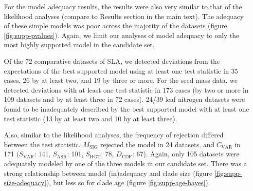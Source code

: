 \documentclass[a4paper,11pt]{article}
\begin{document}
{For the model adequacy results, the results were also very similar to that of the likelihood analyses (compare to Results section in the main text). The adequacy of these simple models was poor across the majority of the datasets (figure \ref{fig:supp-pvalues}). Again, we limit our analyses of model adequacy to only the most highly supported model in the candidate set.

Of the 72 comparative datasets of SLA, we detected deviations from the expectations of the best supported model using at least one test statistic in 35 cases, 26 by at least two, and 19 by three or more.
For the seed mass data, we detected deviations with at least one test statistic in 173 cases (by two or more in 109 datasets and by at least three in 72 cases).
24/39 leaf nitrogen datasets were found to be inadequately described by the best supported model with at least one test statistic (13 by at least two and 10 by at least three).

Also, similar to the likelihood analyses, the frequency of rejection differed between the test statistic. $M_{\text{SIG}}$ rejected the model in 24 datasets, and $C_{\text{VAR}}$ in 171 ($S_{\text{VAR}}$: 141, $S_{\text{ASR}}$: 101, $S_{\text{HGT}}$: 78, $D_{\text{CDF}}$: 67). Again, only 105 datasets were adequately modeled by one of the three models in our candidate set. There was a strong relationship between model (in)adequacy and clade size (figure \ref{fig:supp-size-adequacy}), but less so for clade age (figure \ref{fig:supp-age-bayes}).
 

}
\end{document}
